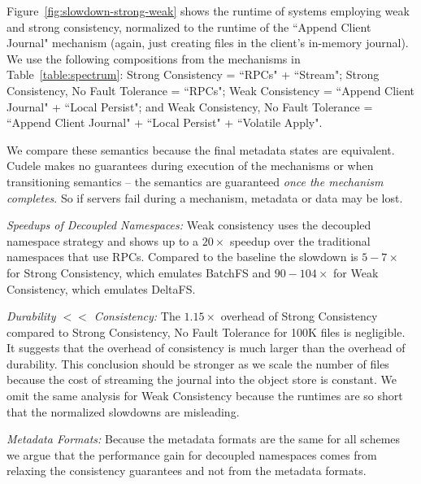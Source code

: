 Figure~\ref{fig:slowdown-strong-weak} shows the runtime of systems employing
weak and strong consistency, normalized to the runtime of the ``Append Client Journal"
mechanism (again, just creating files in the client's in-memory journal).  We
use the following compositions from the mechanisms in
Table~\ref{table:spectrum}:  Strong Consistency = ``RPCs" + ``Stream"; Strong
Consistency, No Fault Tolerance = ``RPCs"; Weak Consistency = ``Append Client Journal" +
``Local Persist"; and Weak Consistency, No Fault Tolerance = ``Append Client Journal" +
``Local Persist" + ``Volatile Apply".

We compare these semantics because the final metadata states are equivalent.
Cudele makes no guarantees during execution of the mechanisms or when
transitioning semantics -- the semantics are guaranteed {\it once the mechanism
completes}. So if servers fail during a mechanism, metadata or data may be
lost.

{\it Speedups of Decoupled Namespaces:} Weak consistency uses the
decoupled namespace strategy and shows up to a \(20\times\) speedup over the
traditional namespaces that use RPCs. Compared to the baseline the slowdown is
\(5-7\times\) for Strong Consistency, which emulates BatchFS and
\(90-104\times\) for Weak Consistency, which emulates DeltaFS.

{\it Durability \(<<\) Consistency:} The \(1.15\times\) overhead of
Strong Consistency compared to Strong Consistency, No Fault Tolerance for
100K files is negligible. It suggests that the overhead of consistency is much
larger than the overhead of durability. This conclusion should be stronger as
we scale the number of files because the cost of streaming the journal into the
object store is constant. We omit the same analysis for Weak Consistency
because the runtimes are so short that the normalized slowdowns are misleading.

{\it Metadata Formats:} Because the metadata formats are the same for
all schemes we argue that the performance gain for decoupled namespaces comes
from relaxing the consistency guarantees and not from the metadata formats.\\

